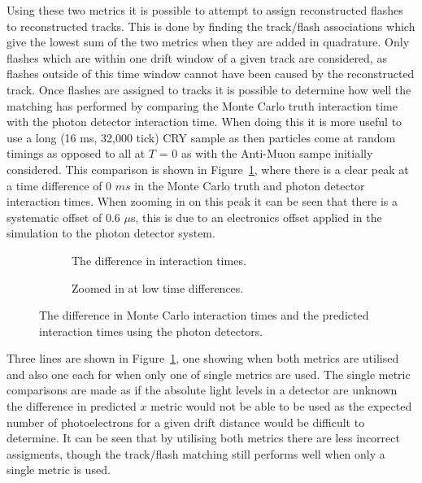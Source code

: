 Using these two metrics it is possible to attempt to assign reconstructed flashes to reconstructed tracks. This is done by finding the track/flash associations which give the lowest sum of the two metrics when they are added in quadrature. Only flashes which are within one drift window of a given track are considered, as flashes outside of this time window cannot have been caused by the reconstructed track. Once flashes are assigned to tracks it is possible to determine how well the matching has performed by comparing the Monte Carlo truth interaction time with the photon detector interaction time. When doing this it is more useful to use a long (16 ms, 32,000 tick) CRY sample as then particles come at random timings as opposed to all at $T$ = 0 as with the Anti-Muon sampe initially considered. This comparison is shown in Figure~\ref{fig:PD_MCPDDiff}, where there is a clear peak at a time difference of 0 $ms$ in the Monte Carlo truth and photon detector interaction times. When zooming in on this peak it can be seen that there is a systematic offset of 0.6 $\mu$s, this is due to an electronics offset applied in the simulation to the photon detector system. \\

\begin{figure}[h!]
  \centering
  \begin{subfigure}{0.45\textwidth}
    \centering
    \caption{The difference in interaction times.}
  \end{subfigure}
  \hspace{0.08\textwidth}
  \begin{subfigure}{0.45\textwidth}
    \centering
    \caption{Zoomed in at low time differences.}
  \end{subfigure}
  \caption[The difference in Monte Carlo interaction times and the predicted interaction times using the photon detectors]
          {The difference in Monte Carlo interaction times and the predicted interaction times using the photon detectors.}
          \label{fig:PD_MCPDDiff}
\end{figure}

Three lines are shown in Figure~\ref{fig:PD_MCPDDiff}, one showing when both metrics are utilised and also one each for when only one of single metrics are used. The single metric comparisons are made as if the absolute light levels in a detector are unknown the difference in predicted $x$ metric would not be able to be used as the expected number of photoelectrons for a given drift distance would be difficult to determine. It can be seen that by utilising both metrics there are less incorrect assigments, though the track/flash matching still performs well when only a single metric is used. 

